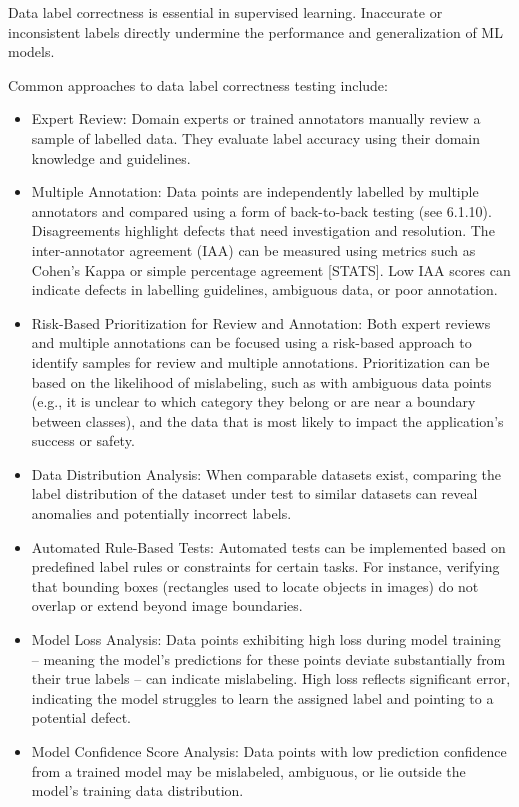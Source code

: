 \documentclass[
  letterpaper,
  DIV=11,
  numbers=noendperiod,
  oneside]{scrreprt}
\begin{document}
\begin{tcolorbox}
Data label correctness{} is essential in supervised learning. Inaccurate
or inconsistent labels directly undermine the performance and
generalization of ML models.

Common approaches to data label correctness testing include:

\begin{itemize}
\item
  Expert Review: Domain experts or trained annotators manually review a
  sample of labelled data. They evaluate label accuracy using their
  domain knowledge and guidelines.
\item
  Multiple Annotation{}: Data points are independently labelled by
  multiple annotators and compared using a form of back-to-back testing
  (see 6.1.10). Disagreements highlight defects that need investigation
  and resolution. The inter-annotator agreement (IAA) can be measured
  using metrics such as Cohen's Kappa or simple percentage agreement
  {[}STATS{]}. Low IAA scores can indicate defects in labelling
  guidelines, ambiguous data, or poor annotation.
\item
  Risk-Based Prioritization for Review and Annotation: Both expert
  reviews and multiple annotations can be focused using a risk-based
  approach to identify samples for review and multiple annotations.
  Prioritization can be based on the likelihood of mislabeling, such as
  with ambiguous data points (e.g., it is unclear to which category they
  belong or are near a boundary between classes), and the data that is
  most likely to impact the application's success or safety.
\item
  Data Distribution Analysis: When comparable datasets exist, comparing
  the label distribution of the dataset under test to similar datasets
  can reveal anomalies and potentially incorrect labels.
\item
  Automated Rule-Based Tests: Automated tests can be implemented based
  on predefined label rules or constraints for certain tasks. For
  instance, verifying that bounding boxes (rectangles used to locate
  objects in images) do not overlap or extend beyond image boundaries.
\item
  Model Loss Analysis: Data points exhibiting high loss during model
  training -- meaning the model's predictions for these points deviate
  substantially from their true labels -- can indicate mislabeling. High
  loss reflects significant error, indicating the model struggles to
  learn the assigned label and pointing to a potential defect.
\item
  Model Confidence Score Analysis: Data points with low prediction
  confidence from a trained model may be mislabeled, ambiguous, or lie
  outside the model's training data distribution.
\end{itemize}


\end{tcolorbox}
\end{document}

